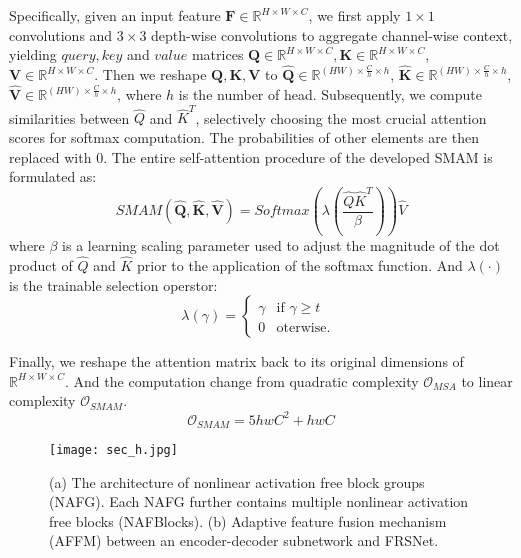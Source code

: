 \documentclass[lettersize,journal]{IEEEtran}
\begin{document}
Specifically, given an input feature $\textbf{F} \in \mathbb R^{H \times W \times C } $, we first apply $1 \times 1$ convolutions and $3 \times 3$  depth-wise convolutions to aggregate channel-wise context, yielding $query, key$ and $value$ matrices $\mathbf{Q} \in \mathbb R^{H \times W \times C}, \mathbf{K} \in \mathbb R^{H \times W \times C}$, $\mathbf{V} \in \mathbb R^{H \times W \times C}$. Then we reshape $\mathbf{Q}, \mathbf{K}, \mathbf{V}$ to $\mathbf{\hat{Q}} \in \mathbb R^{(H W) \times \frac{C}{h} \times h}$, $\mathbf{\hat{K}} \in \mathbb R^{(H W) \times \frac{C}{h} \times h}$, $\mathbf{\hat{V}} \in \mathbb R^{(H W) \times \frac{C}{h} \times h}$, where $h$ is the number of head.
Subsequently, we compute similarities between $\hat{Q}$ and $\hat{K}^T$, selectively choosing the most crucial attention scores for softmax computation. The probabilities of other elements are then replaced with 0. The entire self-attention procedure of the developed SMAM is formulated as:
\begin{equation}
    \label{sam}
    SMAM(\mathbf{\hat{Q}},\mathbf{\hat{K}},\mathbf{\hat{V}})=Softmax(\lambda(\frac{\hat{Q}\hat{K}^T}{\beta})) \hat{V} 
\end{equation}
where $\beta$ is a learning scaling parameter used to adjust the magnitude of the dot product of $\hat{Q}$ and $\hat{K}$ prior to the application of the softmax function. And $\lambda(\cdot)$ is the trainable selection operstor:
\begin{equation}
    \label{sam2}
    \lambda(\gamma) = \begin{cases}
  \gamma & \text{if } \gamma \geq t \\
  0 & \text{oterwise. } 
\end{cases}
\end{equation}

Finally, we reshape the attention matrix back to its original dimensions of $\mathbb R^{H \times W \times C}$.  And the computation change from  quadratic complexity $\mathcal{O}_{MSA}$ to  linear complexity $\mathcal{O}_{SMAM}$.
\begin{equation}
	\label{equ:101}
    \mathcal{O}_{SMAM} = 5hwC^2 + hwC
\end{equation}


\begin{figure*}[!htb] \centering
	\texttt{[image: sec\_h.jpg]}
	\caption{(a) The  architecture of nonlinear activation free block groups (NAFG). Each NAFG further contains multiple nonlinear activation free blocks (NAFBlocks). (b) Adaptive feature fusion mechanism (AFFM) between an encoder-decoder subnetwork and FRSNet.}
	\label{fig:sec_h}
\end{figure*}
\end{document}
